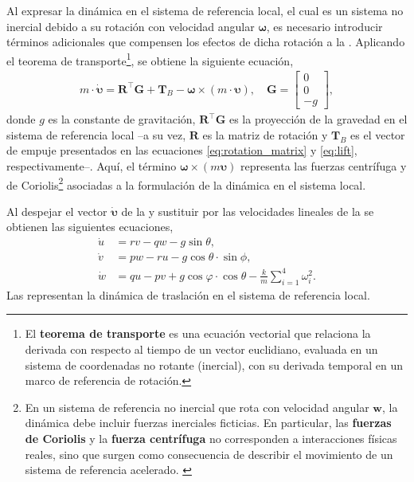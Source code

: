 Al expresar la dinámica en el sistema de referencia local, el cual es un sistema no inercial debido a su rotación con velocidad angular $\bm{\omega}$, es necesario introducir términos adicionales que compensen los efectos de dicha rotación a la . Aplicando el teorema de transporte\footnote{El \textbf{teorema de transporte} es una ecuación vectorial que relaciona la derivada con respecto al tiempo de un vector euclidiano, evaluada en un sistema de coordenadas no rotante (inercial), con su derivada temporal en un marco de referencia de rotación\cite{Rosen2010}.}, se obtiene la siguiente ecuación, 
\begin{align}
    m\cdot\dot{\bm{\upsilon}} = \mathbf{R}^{\top}\mathbf{G} + \mathbf{T}_{B} -\bm{\omega} \times (m \cdot \bm{\upsilon}), \quad \mathbf{G}
    =
    \begin{bmatrix}
        0 \\
        0 \\
        -g
    \end{bmatrix}, 
    \label{eq:u_dynamics}
\end{align}
donde $g$ es la constante de gravitación, $\mathbf{R}^{\top}\mathbf{G}$ es la proyección de la gravedad en el sistema de referencia local –a su vez, $\mathbf{R}$ es la matriz de rotación y $\mathbf{T}_{B}$ es el vector de empuje presentados en las ecuaciones \ref{eq:rotation_matrix} y \ref{eq:lift}, respectivamente–. Aquí, el término $\bm{\omega} \times (m \bm{\upsilon})$ representa las fuerzas centrífuga y de Coriolis\footnote{En un sistema de referencia no inercial que rota con velocidad angular $\bm{w}$, la dinámica debe incluir fuerzas inerciales ficticias. En particular, las \textbf{fuerzas de Coriolis} y la \textbf{fuerza centrífuga} no corresponden a interacciones físicas reales, sino que surgen como consecuencia de describir el movimiento de un sistema de referencia acelerado. \cite{goldstein2002}} asociadas a la formulación de la dinámica en el sistema local. \cite{Lynch2017}

Al despejar el vector $\dot{\bm{\upsilon}}$ de la  y sustituir por las velocidades lineales de la  se obtienen las siguientes ecuaciones,
\begin{align}
    \dot u &= rv -qw - g \sin\theta, \label{eq:u} \\
    \dot v &= pw -ru -g\cos\theta \cdot \sin\phi, \label{eq:v}\\
    \dot w &= qu -pv +g\cos\varphi \cdot \cos\theta-\frac{k}{m} \sum_{i=1}^{4}\omega_i^2 \label{eq:w}.
\end{align}
Las  representan la dinámica de traslación en el sistema de referencia local.

